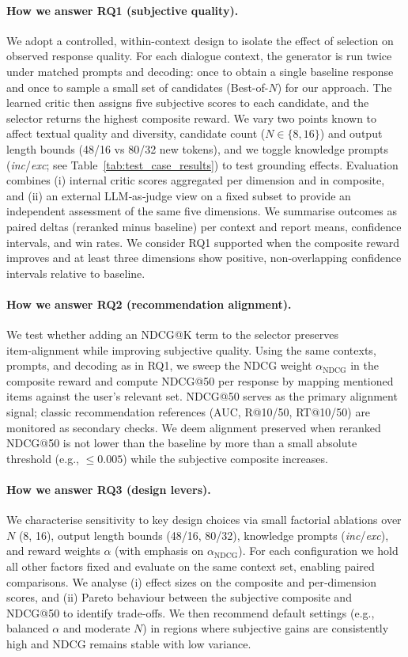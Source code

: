 \documentclass[12pt]{article}
\begin{document}
  \paragraph{How we answer RQ1 (subjective quality).}
  We adopt a controlled, within-context design to isolate the effect of selection on observed response quality. For each dialogue context, the generator is run twice under matched prompts and decoding: once to obtain a single baseline response and once to sample a small set of candidates (Best-of-$N$) for our approach. The learned critic then assigns five subjective scores to each candidate, and the selector returns the highest composite reward. We vary two points known to affect textual quality and diversity, candidate count ($N\in\{8,16\}$) and output length bounds (48/16 vs 80/32 new tokens), and we toggle knowledge prompts (\textit{inc}/\textit{exc}; see Table~\ref{tab:test_case_results}) to test grounding effects. Evaluation combines (i) internal critic scores aggregated per dimension and in composite, and (ii) an external LLM‑as‑judge view on a fixed subset to provide an independent assessment of the same five dimensions. We summarise outcomes as paired deltas (reranked minus baseline) per context and report means, confidence intervals, and win rates. We consider RQ1 supported when the composite reward improves and at least three dimensions show positive, non‑overlapping confidence intervals relative to baseline.

  \paragraph{How we answer RQ2 (recommendation alignment).}
  We test whether adding an NDCG@K term to the selector preserves item‑alignment while improving subjective quality. Using the same contexts, prompts, and decoding as in RQ1, we sweep the NDCG weight $\alpha_{\mathrm{NDCG}}$ in the composite reward and compute NDCG@50 per response by mapping mentioned items against the user's relevant set. NDCG@50 serves as the primary alignment signal; classic recommendation references (AUC, R@10/50, RT@10/50) are monitored as secondary checks. We deem alignment preserved when reranked NDCG@50 is not lower than the baseline by more than a small absolute threshold (e.g., $\leq 0.005$) while the subjective composite increases.

  \paragraph{How we answer RQ3 (design levers).}
  We characterise sensitivity to key design choices via small factorial ablations over $N$ (8, 16), output length bounds (48/16, 80/32), knowledge prompts (\textit{inc}/\textit{exc}), and reward weights $\alpha$ (with emphasis on $\alpha_{\mathrm{NDCG}}$). For each configuration we hold all other factors fixed and evaluate on the same context set, enabling paired comparisons. We analyse (i) effect sizes on the composite and per‑dimension scores, and (ii) Pareto behaviour between the subjective composite and NDCG@50 to identify trade‑offs. We then recommend default settings (e.g., balanced $\alpha$ and moderate $N$) in regions where subjective gains are consistently high and NDCG remains stable with low variance.
  
\end{document}
